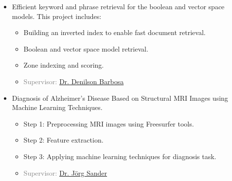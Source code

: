 	\begin{itemize}
		\item Efficient keyword and phrase retrieval for the boolean and vector space models. This project includes:
		\begin{itemize}
			\item Building an inverted index to enable fast document retrieval.
			\item Boolean and vector space model retrieval.
			\item Zone indexing and scoring.
			\item \textcolor{gray}{Supervisor: \href{https://sites.ualberta.ca/~denilson/}{Dr. Denilson Barbosa}}
		\end{itemize}
		
		\item Diagnosis of Alzheimer’s Disease Based on Structural MRI Images using Machine Learning Techniques.
		\begin{itemize}
			\item Step 1: Preprocessing MRI images using Freesurfer tools.
			\item Step 2: Feature extraction.
			\item Step 3: Applying machine learning techniques for diagnosis task.
			\item \textcolor{gray}{Supervisor: \href{http://webdocs.cs.ualberta.ca/~joerg/}{Dr. Jörg Sander}}
			
		\end{itemize}
		

\end{itemize}
